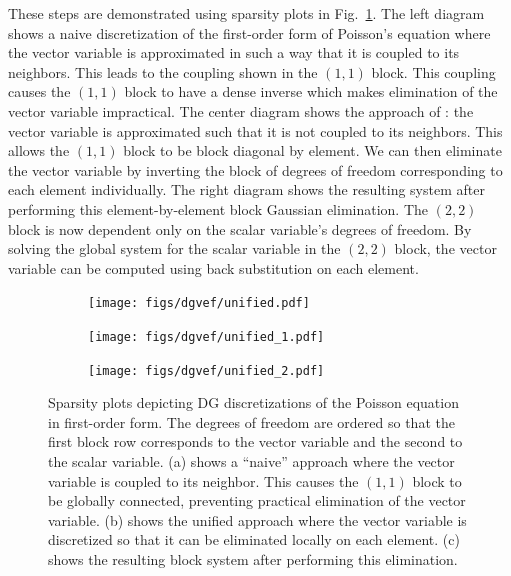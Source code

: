 \documentclass[../doc.tex]{subfiles}
\begin{document}
These steps are demonstrated using sparsity plots in Fig.~\ref{dgvef:unified_spy}. The left diagram shows a naive discretization of the first-order form of Poisson's equation where the vector variable is approximated in such a way that it is coupled to its neighbors. This leads to the coupling shown in the $(1,1)$ block. This coupling causes the $(1,1)$ block to have a dense inverse which makes elimination of the vector variable impractical. The center diagram shows the approach of \textcite{Arnold2002}: the vector variable is approximated such that it is not coupled to its neighbors. This allows the $(1,1)$ block to be block diagonal by element. We can then eliminate the vector variable by inverting the block of degrees of freedom corresponding to each element individually. The right diagram shows the resulting system after performing this element-by-element block Gaussian elimination. The $(2,2)$ block is now dependent only on the scalar variable's degrees of freedom. By solving the global system for the scalar variable in the $(2,2)$ block, the vector variable can be computed using back substitution on each element. 
\begin{figure}
\centering
\begin{subfigure}{.32\textwidth}
	\centering
	\texttt{[image: figs/dgvef/unified.pdf]}
	\caption{}
\end{subfigure}
\begin{subfigure}{.32\textwidth}
	\centering
	\texttt{[image: figs/dgvef/unified\_1.pdf]}
	\caption{}
\end{subfigure}
\begin{subfigure}{.32\textwidth}
	\centering
	\texttt{[image: figs/dgvef/unified\_2.pdf]}
	\caption{}
\end{subfigure}
\caption{Sparsity plots depicting DG discretizations of the Poisson equation in first-order form. The degrees of freedom are ordered so that the first block row corresponds to the vector variable and the second to the scalar variable. (a) shows a ``naive'' approach where the vector variable is coupled to its neighbor. This causes the $(1,1)$ block to be globally connected, preventing practical elimination of the vector variable. (b) shows the unified approach where the vector variable is discretized so that it can be eliminated locally on each element. (c) shows the resulting block system after performing this elimination. }
\label{dgvef:unified_spy}
\end{figure}
\end{document}
